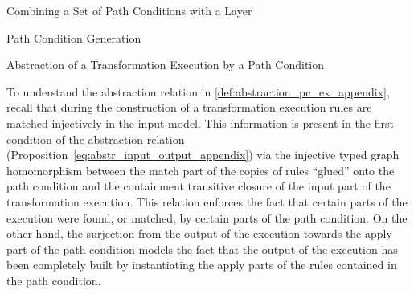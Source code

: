 \begin{definition} {Combining a Set of Path Conditions with a Layer\\}
\label{def:path_cond_set_layer_comb_appendix}
\end{definition}


\begin{definition} {Path Condition Generation\\}
\label{def:path_cond_gen_appendix}
\end{definition}


\begin{definition}{Abstraction of a Transformation Execution by a Path Condition\\}
\label{def:abstraction_pc_ex_appendix}
\end{definition}

To understand the abstraction relation in \cref{def:abstraction_pc_ex_appendix}, recall
that during the construction of a transformation execution rules are matched
injectively in the input model. This information is present in the first
condition of the abstraction relation (Proposition~\ref{eq:abstr_input_output_appendix})
via the injective typed graph homomorphism between the match part of the copies
of rules ``glued'' onto the path condition and the containment transitive
closure of the input part of the transformation execution. This relation
enforces the fact that certain parts of the execution were found, or matched, by
certain parts of the path condition.
On the other hand, the surjection from the output of the execution towards the
apply part of the path condition models the fact that the output of the
execution has been completely built by instantiating the apply parts of the
rules contained in the path condition.

